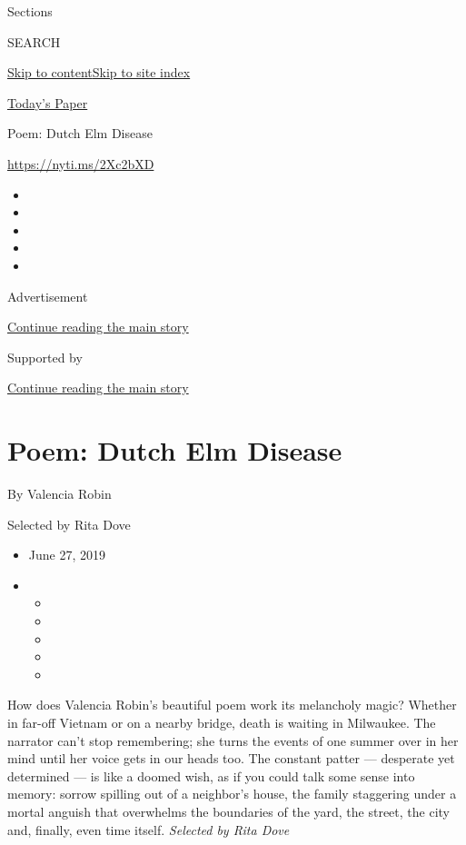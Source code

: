 Sections

SEARCH

\protect\hyperlink{site-content}{Skip to
content}\protect\hyperlink{site-index}{Skip to site index}

\href{https://myaccount.nytimes3xbfgragh.onion/auth/login?response_type=cookie\&client_id=vi}{}

\href{https://www.nytimes3xbfgragh.onion/section/todayspaper}{Today's
Paper}

Poem: Dutch Elm Disease

\url{https://nyti.ms/2Xc2bXD}

\begin{itemize}
\item
\item
\item
\item
\item
\end{itemize}

Advertisement

\protect\hyperlink{after-top}{Continue reading the main story}

Supported by

\protect\hyperlink{after-sponsor}{Continue reading the main story}

\hypertarget{poem-dutch-elm-disease}{%
\section{Poem: Dutch Elm Disease}\label{poem-dutch-elm-disease}}

By Valencia Robin

Selected by Rita Dove

\begin{itemize}
\item
  June 27, 2019
\item
  \begin{itemize}
  \item
  \item
  \item
  \item
  \item
  \end{itemize}
\end{itemize}

How does Valencia Robin's beautiful poem work its melancholy magic?
Whether in far-off Vietnam or on a nearby bridge, death is waiting in
Milwaukee. The narrator can't stop remembering; she turns the events of
one summer over in her mind until her voice gets in our heads too. The
constant patter --- desperate yet determined --- is like a doomed wish,
as if you could talk some sense into memory: sorrow spilling out of a
neighbor's house, the family staggering under a mortal anguish that
overwhelms the boundaries of the yard, the street, the city and,
finally, even time itself. \emph{Selected by Rita Dove}

